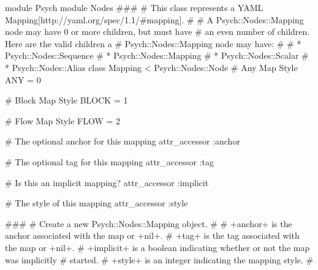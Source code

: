 module Psych
  module Nodes
    ###
    # This class represents a {YAML Mapping}[http://yaml.org/spec/1.1/#mapping].
    #
    # A Psych::Nodes::Mapping node may have 0 or more children, but must have
    # an even number of children.  Here are the valid children a
    # Psych::Nodes::Mapping node may have:
    #
    # * Psych::Nodes::Sequence
    # * Psych::Nodes::Mapping
    # * Psych::Nodes::Scalar
    # * Psych::Nodes::Alias
    class Mapping < Psych::Nodes::Node
      # Any Map Style
      ANY   = 0

      # Block Map Style
      BLOCK = 1

      # Flow Map Style
      FLOW  = 2

      # The optional anchor for this mapping
      attr_accessor :anchor

      # The optional tag for this mapping
      attr_accessor :tag

      # Is this an implicit mapping?
      attr_accessor :implicit

      # The style of this mapping
      attr_accessor :style

      ###
      # Create a new Psych::Nodes::Mapping object.
      #
      # +anchor+ is the anchor associated with the map or +nil+.
      # +tag+ is the tag associated with the map or +nil+.
      # +implicit+ is a boolean indicating whether or not the map was implicitly
      # started.
      # +style+ is an integer indicating the mapping style.
      #
   